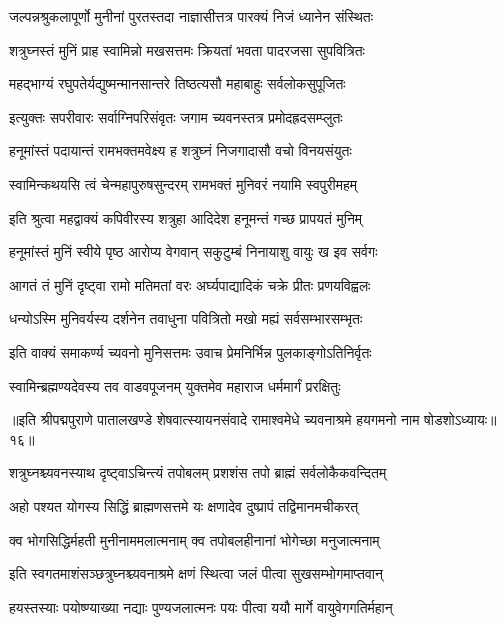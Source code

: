 \twolineshloka
{जल्पन्नश्रुकलापूर्णो मुनीनां पुरतस्तदा}
{नाज्ञासीत्तत्र पारक्यं निजं ध्यानेन संस्थितः}%

\twolineshloka
{शत्रुघ्नस्तं मुनिं प्राह स्वामिन्नो मखसत्तमः}
{क्रियतां भवता पादरजसा सुपवित्रितः}%

\twolineshloka
{महद्भाग्यं रघुपतेर्यद्युष्मन्मानसान्तरे}
{तिष्ठत्यसौ महाबाहुः सर्वलोकसुपूजितः}%

\twolineshloka
{इत्युक्तः सपरीवारः सर्वाग्निपरिसंवृतः}
{जगाम च्यवनस्तत्र प्रमोदह्रदसम्प्लुतः}%

\twolineshloka
{हनूमांस्तं पदायान्तं रामभक्तमवेक्ष्य ह}
{शत्रुघ्नं निजगादासौ वचो विनयसंयुतः}%

\twolineshloka
{स्वामिन्कथयसि त्वं चेन्महापुरुषसुन्दरम्}
{रामभक्तं मुनिवरं नयामि स्वपुरीमहम्}%

\twolineshloka
{इति श्रुत्वा महद्वाक्यं कपिवीरस्य शत्रुहा}
{आदिदेश हनूमन्तं गच्छ प्रापयतं मुनिम्}%

\twolineshloka
{हनूमांस्तं मुनिं स्वीये पृष्ठ आरोप्य वेगवान्}
{सकुटुम्बं निनायाशु वायुः ख इव सर्वगः}%

\twolineshloka
{आगतं तं मुनिं दृष्ट्वा रामो मतिमतां वरः}
{अर्घ्यपाद्यादिकं चक्रे प्रीतः प्रणयविह्वलः}%

\twolineshloka
{धन्योऽस्मि मुनिवर्यस्य दर्शनेन तवाधुना}
{पवित्रितो मखो मह्यं सर्वसम्भारसम्भृतः}%

\twolineshloka
{इति वाक्यं समाकर्ण्य च्यवनो मुनिसत्तमः}
{उवाच प्रेमनिर्भिन्न पुलकाङ्गोऽतिनिर्वृतः}%

\twolineshloka
{स्वामिन्ब्रह्मण्यदेवस्य तव वाडवपूजनम्}
{युक्तमेव महाराज धर्ममार्गं प्ररक्षितुः}%

{॥इति श्रीपद्मपुराणे पातालखण्डे शेषवात्स्यायनसंवादे रामाश्वमेधे च्यवनाश्रमे हयगमनो नाम षोडशोऽध्यायः॥१६॥}

\resetShloka


\twolineshloka
{शत्रुघ्नश्च्यवनस्याथ दृष्ट्वाऽचिन्त्यं तपोबलम्}
{प्रशशंस तपो ब्राह्मं सर्वलोकैकवन्दितम्}%

\twolineshloka
{अहो पश्यत योगस्य सिद्धिं ब्राह्मणसत्तमे}
{यः क्षणादेव दुष्प्रापं तद्विमानमचीकरत्}%

\twolineshloka
{क्व भोगसिद्धिर्महती मुनीनाममलात्मनाम्}
{क्व तपोबलहीनानां भोगेच्छा मनुजात्मनाम्}%

\twolineshloka
{इति स्वगतमाशंसञ्छत्रुघ्नश्च्यवनाश्रमे}
{क्षणं स्थित्वा जलं पीत्वा सुखसम्भोगमाप्तवान्}%

\twolineshloka
{हयस्तस्याः पयोष्ण्याख्या नद्याः पुण्यजलात्मनः}
{पयः पीत्वा ययौ मार्गे वायुवेगगतिर्महान्}%

